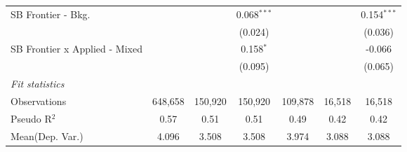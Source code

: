 \begin{tabular}{lcccccc}
   SB Frontier - Bkg.            &               &               & 0.068$^{***}$ &               &               & 0.154$^{***}$\\   
                                 &               &               & (0.024)       &               &               & (0.036)\\   
   SB Frontier x Applied - Mixed &               &               & 0.158$^{*}$   &               &               & -0.066\\   
                                 &               &               & (0.095)       &               &               & (0.065)\\   
   \midrule
   \emph{Fit statistics}\\
   Observations                  & 648,658       & 150,920       & 150,920       & 109,878       & 16,518        & 16,518\\  
   Pseudo R$^2$                  & 0.57          & 0.51          & 0.51          & 0.49          & 0.42          & 0.42\\  
Mean(Dep. Var.) & 4.096 & 3.508 & 3.508 & 3.974 & 3.088 & 3.088 \\
   

\end{tabular}
